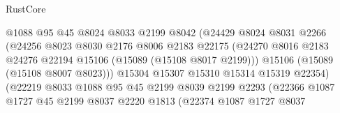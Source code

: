 \begin{lexlean}{RustCore}
\begin{coremodule}
                                      @1088
                                      @95
                                      @45
                                      @8024
                                      @8033
                                      @2199
                                      @8042
                                      (@24429
                                        @8024
                                        @8031
                                        @2266
                                        (@24256
                                          @8023
                                          @8030
                                          @2176
                                          @8006
                                          @2183
                                          @22175
                                          (@24270
                                            @8016
                                            @2183
                                            @24276
                                            @22194
                                            @15106
                                            (@15089 (@15108 @8017 @2199)))
                                          @15106
                                          (@15089 (@15108 @8007 @8023)))
                                        @15304
                                        @15307
                                        @15310
                                        @15314
                                        @15319
                                        @22354)
                                      (@22219
                                        @8033
                                        @1088
                                        @95
                                        @45
                                        @2199
                                        @8039
                                        @2199
                                        @2293
                                        (@22366
                                          @1087
                                          @1727
                                          @45
                                          @2199
                                          @8037
                                          @2220
                                          @1813
                                          (@22374
                                            @1087
                                            @1727
                                            @8037

\end{coremodule}
\end{lexlean}
